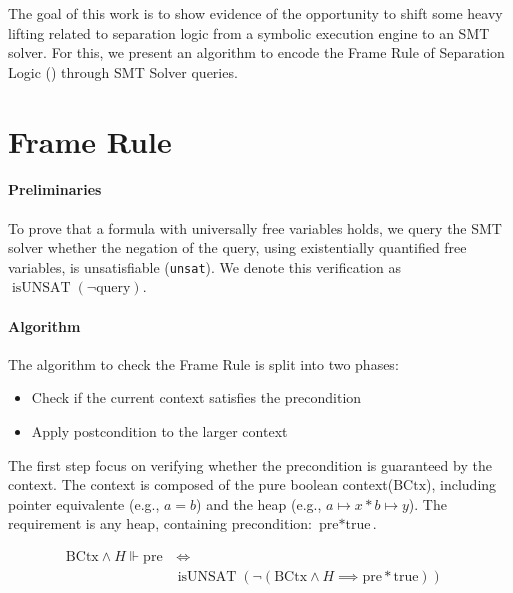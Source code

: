 \documentclass[sigplan,screen,review]{acmart}
\begin{document}
The goal of this work is to show evidence of the opportunity to shift some heavy lifting related to separation logic from a symbolic execution engine to an SMT solver. For this, we present an algorithm to encode the Frame Rule of Separation Logic () through SMT Solver queries.

\section{Frame Rule}

\paragraph{Preliminaries} To prove that a formula with universally free variables holds, we query the SMT solver whether the negation of the query, using existentially quantified free variables, is unsatisfiable (\texttt{unsat}). We denote this verification as $\operatorname{isUNSAT}(\neg\mbox{query})$.


\paragraph{Algorithm} The algorithm to check the Frame Rule is split into two phases: 

\begin{itemize}
    \item Check if the current context satisfies the precondition
    \item Apply postcondition to the larger context
\end{itemize}


The first step focus on verifying whether the precondition is guaranteed by the context. The context is composed of the pure boolean context($\mbox{BCtx}$), including pointer equivalente (e.g., $a=b$) and the heap (e.g., $a \mapsto x * b \mapsto y$). The requirement is any heap, containing precondition: $\text{pre} * \text{true}$.

\begin{align*}
\mbox{BCtx} \wedge H \Vdash \mbox{pre} & \, \iff & \\ & \operatorname{isUNSAT}(\neg(\mbox{BCtx} \wedge H \implies \mbox{pre} \mathbin{*} \mbox{true} ))
\end{align*}

\end{document}
